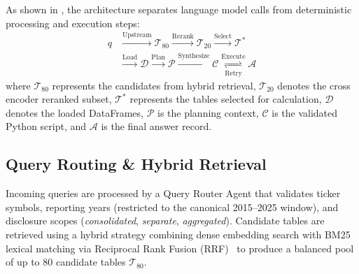 \documentclass[10pt,journal,compsoc]{IEEEtran}
\begin{document}
As shown in , the architecture separates language model calls from deterministic processing and execution steps:
\begin{equation}
\begin{aligned}
    q &\xrightarrow{\text{Upstream}} \mathcal{T}_{80} \xrightarrow{\text{Rerank}} \mathcal{T}_{20} \xrightarrow{\text{Select}} \mathcal{T}^* \\
      &\xrightarrow{\text{Load}} \mathcal{D} \xrightarrow{\text{Plan}} \mathcal{P} \xrightarrow{\text{Synthesize}} \mathcal{C} \underset{\text{Retry}}{\overset{\text{Execute}}{\rightleftharpoons}} \mathcal{A}
\end{aligned}
\end{equation}
where $\mathcal{T}_{80}$ represents the candidates from hybrid retrieval, $\mathcal{T}_{20}$ denotes the cross encoder reranked subset, $\mathcal{T}^*$ represents the tables selected for calculation, $\mathcal{D}$ denotes the loaded DataFrames, $\mathcal{P}$ is the planning context, $\mathcal{C}$ is the validated Python script, and $\mathcal{A}$ is the final answer record.

\subsection{Query Routing \& Hybrid Retrieval}
Incoming queries are processed by a Query Router Agent that validates ticker symbols, reporting years (restricted to the canonical 2015--2025 window), and disclosure scopes (\textit{consolidated}, \textit{separate}, \textit{aggregated}). Candidate tables are retrieved using a hybrid strategy combining dense embedding search with BM25 lexical matching via Reciprocal Rank Fusion (RRF)~\cite{cormack2009reciprocal,robertson2009probabilistic} to produce a balanced pool of up to 80 candidate tables $\mathcal{T}_{80}$.
\end{document}
